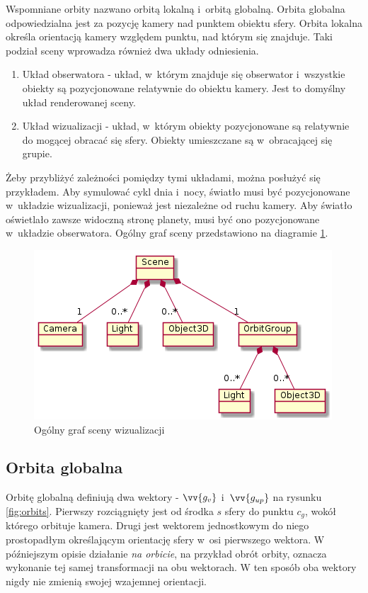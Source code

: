 Wspomniane orbity nazwano orbitą lokalną i~orbitą globalną. Orbita globalna odpowiedzialna jest za pozycję kamery nad punktem obiektu sfery. Orbita lokalna określa orientacją kamery względem punktu, nad którym się znajduje. Taki podział sceny wprowadza również dwa układy odniesienia.

\begin{enumerate}
    \item Układ obserwatora - układ, w~którym znajduje się obserwator i~wszystkie obiekty są pozycjonowane relatywnie do obiektu kamery. Jest to domyślny układ renderowanej sceny.
    \item Układ wizualizacji - układ, w~którym obiekty pozycjonowane są relatywnie do mogącej obracać się sfery. Obiekty umieszczane są w~obracającej się grupie.
\end{enumerate}

Żeby przybliżyć zależności pomiędzy tymi układami, można posłużyć się przykładem. Aby symulować cykl dnia i~nocy, światło musi być pozycjonowane w~układzie wizualizacji, ponieważ jest niezależne od ruchu kamery. Aby światło oświetlało zawsze widoczną stronę planety, musi być ono pozycjonowane w~układzie obserwatora. Ogólny graf sceny przedstawiono na diagramie \ref{fig:c3_scene_graph}.

\begin{figure}[h]
    \centering
    \includegraphics[scale=0.6]{diagrams/out/c3_scene_graph.png}
    \caption{Ogólny graf sceny wizualizacji}
    \label{fig:c3_scene_graph}
\end{figure}

\subsection{Orbita globalna}

Orbitę globalną definiują dwa wektory - $\vv{g_v}$ i~$\vv{g_{up}}$ na rysunku \ref{fig:orbits}. Pierwszy rozciągnięty jest od środka $s$ sfery do punktu $c_g$, wokół którego orbituje kamera. Drugi jest wektorem jednostkowym do niego prostopadłym określającym orientację sfery w~osi pierwszego wektora. W późniejszym opisie działanie \textit{na orbicie}, na przykład obrót orbity, oznacza wykonanie tej samej transformacji na obu wektorach. W ten sposób oba wektory nigdy nie zmienią swojej wzajemnej orientacji.

